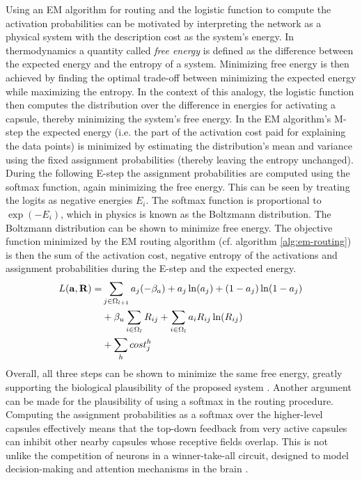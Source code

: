 Using an EM algorithm for routing and the logistic function to compute the activation probabilities can be motivated by interpreting the network as a physical system with the description cost as the system's energy. In thermodynamics a quantity called \emph{free energy} is defined as the difference between the expected energy and the entropy of a system. Minimizing free energy is then achieved by finding the optimal trade-off between minimizing the expected energy while maximizing the entropy. In the context of this analogy, the logistic function then computes the distribution over the difference in energies for activating a capsule, thereby minimizing the system's free energy. In the EM algorithm's M-step the expected energy (i.e. the part of the activation cost paid for explaining the data points) is minimized by estimating the distribution's mean and variance using the fixed assignment probabilities (thereby leaving the entropy unchanged). During the following E-step the assignment probabilities are computed using the softmax function, again minimizing the free energy. This can be seen by treating the logits as negative energies $E_i$. The softmax function is proportional to $\exp(-E_i)$, which in physics is known as the Boltzmann distribution. The Boltzmann distribution can be shown to minimize free energy. The objective function minimized by the EM routing algorithm (cf. algorithm \ref{alg:em-routing}) is then the sum of the activation cost, negative entropy of the activations and assignment probabilities during the E-step and the expected energy.
\begin{align}
    L\qty(\vb{a}, \vb{R}) =& \sum_{j\in\Omega_{l+1}}a_j\qty(-\beta_a)+a_j \ln(a_j)+(1-a_j)\ln(1-a_j)\\
    &+\beta_u\sum_{i\in\Omega_l}R_{ij}+\sum_{i\in\Omega_l}a_i R_{ij}\ln(R_{ij})\\
    &+\sum_h cost_j^h\label{eq:objective-function}
\end{align}
Overall, all three steps can be shown to minimize the same free energy, greatly supporting the biological plausibility of the proposed system \cite{lecun2006tutorial}. Another argument can be made for the plausibility of using a softmax in the routing procedure. Computing the assignment probabilities as a softmax over the higher-level capsules effectively means that the top-down feedback from very active capsules can inhibit other nearby capsules whose receptive fields overlap. This is not unlike the competition of neurons in a winner-take-all circuit, designed to model decision-making and attention mechanisms in the brain \cite{lee1999attention}.
